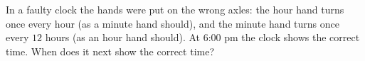 In a faulty clock the hands were put on the wrong axles: the hour hand turns once every hour (as a minute hand should), and the minute hand turns once every $12$ hours (as an hour hand should). At 6:00 pm the clock shows the correct time. When does it next show the correct time?
